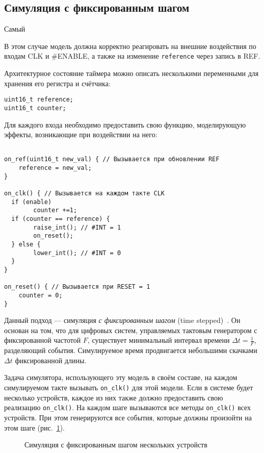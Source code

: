 \subsection{Симуляция с фиксированным шагом}\label{sec:time-stepped}

Самый

В этом случае модель должна корректно реагировать на внешние воздействия по входам CLK и \#ENABLE, а также на изменение \texttt{reference} через запись в REF.

Архитектурное состояние таймера можно описать несколькими переменными для хранения его регистра и счётчика:

\begin{lstlisting}
uint16_t reference;
uint16_t counter;
\end{lstlisting}

Для каждого входа необходимо предоставить свою функцию, моделирующую эффекты, возникающие при воздействии на него:

\begin{lstlisting}

on_ref(uint16_t new_val) { // Вызывается при обновлении REF
    reference = new_val;
}

on_clk() { // Вызывается на каждом такте CLK
  if (enable)
        counter +=1;
  if (counter == reference) {
        raise_int(); // #INT = 1
        on_reset();
  } else {
        lower_int(); // #INT = 0
  }
}

on_reset() { // Вызывается при RESET = 1
    counter = 0;
}
\end{lstlisting}


Данный подход — симуляция \textit{с фиксированным шагом} (\abbr time stepped)~\cite{ferscha-1995-pdes}. Он основан на том, что для цифровых систем, управляемых тактовым генератором с фиксированной частотой $F$, существует минимальный интервал времени $\Delta t = \frac{1}{F}$, разделяющий события. Симулируемое время продвигается небольшими скачками $\Delta t$ фиксированной длины.

Задача симулятора, использующего эту модель в своём составе, на каждом симулируемом такте вызывать \texttt{on_clk()} для этой модели. Если в системе будет несколько устройств, каждое из них также должно предоставить свою реализацию \texttt{on_clk()}. На каждом шаге вызываются все методы \texttt{on_clk()} всех устройств. При этом генерируются все события, которые должны произойти на этом шаге (рис. \ref{fig:time-stepped-sim}).

\begin{figure}[htp]
    \centering
    \caption[Симуляция с фиксированным шагом]{Симуляция с фиксированным шагом нескольких устройств}
    \label{fig:time-stepped-sim}
\end{figure}

